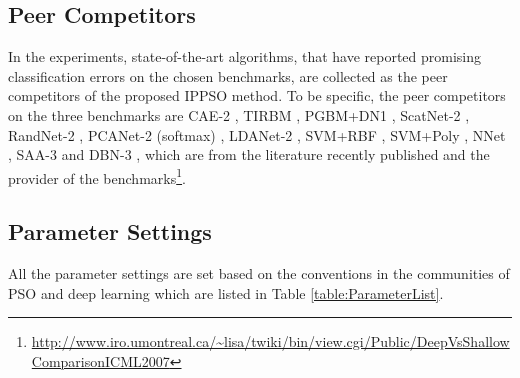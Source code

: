 \documentclass[conference]{IEEEtran}
\begin{document}
\subsection{Peer Competitors}\label{secpeer-competitors}

In the experiments, state-of-the-art algorithms, that have reported promising classification errors on the chosen benchmarks, are collected as the peer competitors of the proposed IPPSO method. To be specific, the peer competitors on the three benchmarks are CAE-2 \cite{CAE:Rifai}, TIRBM \cite{TIRBM:Sohn}, PGBM+DN1 \cite{PGBMDN1:Sohn}, ScatNet-2 \cite{ScatteringCNN:Bruna}, RandNet-2 \cite{DLBaseline:Chan}, PCANet-2 (softmax) \cite{DLBaseline:Chan}, LDANet-2 \cite{DLBaseline:Chan}, SVM+RBF \cite{DeepArchitectureEval:Larochelle}, SVM+Poly \cite{DeepArchitectureEval:Larochelle}, NNet \cite{DeepArchitectureEval:Larochelle}, SAA-3 \cite{DeepArchitectureEval:Larochelle} and DBN-3 \cite{DeepArchitectureEval:Larochelle}, which are from the literature \cite{DLBaseline:Chan} recently published and the provider of the benchmarks\footnote{\url{http://www.iro.umontreal.ca/~lisa/twiki/bin/view.cgi/Public/DeepVsShallowComparisonICML2007}}.

\subsection{Parameter Settings}

All the parameter settings are set based on the conventions in the communities of PSO \cite{PSOEPSettings:Van} and deep learning \cite{DLGuide:Hinton} which are listed in Table \ref{table:ParameterList}.
\end{document}
